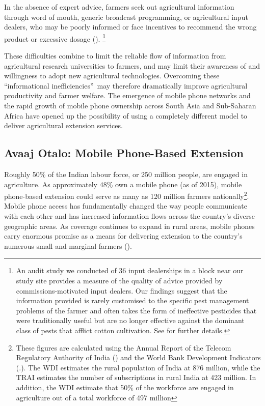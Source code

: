 \documentclass[12pt]{article}
\begin{document}
{\normalsize In the absence of expert advice, farmers seek out agricultural
information through word of mouth, generic broadcast programming, or
agricultural input dealers, who may be poorly informed or face incentives to
recommend the wrong product or excessive dosage (\citealp{Anderson_2007}).%
\footnote{%
An audit study we conducted of 36 input dealerships in a block near our
study site provides a measure of the quality of advice provided by
commissions-motivated input dealers. Our findings suggest that the
information provided is rarely customised to the specific pest management
problems of the farmer and often takes the form of ineffective pesticides
that were traditionally useful but are no longer effective against the
dominant class of pests that afflict cotton cultivation. See \citep{cole2017promise} for further details. }}

{\normalsize These difficulties combine to limit the reliable flow of
information from agricultural research universities to farmers, and may
limit their awareness of and willingness to adopt new agricultural
technologies. Overcoming these \textquotedblleft informational
inefficiencies\textquotedblright\ may therefore dramatically improve
agricultural productivity and farmer welfare. The emergence of mobile phone
networks and the rapid growth of mobile phone ownership across South Asia
and Sub-Saharan Africa have opened up the possibility of using a completely
different model to deliver agricultural extension services. }

\subsection{\protect\normalsize Avaaj Otalo: Mobile Phone-Based Extension}

{\normalsize Roughly 50\% of the Indian labour force, or 250 million people,
are engaged in agriculture. As approximately 48\% own a mobile phone (as of
2015), mobile phone-based extension could serve as many as 120 million
farmers nationally\footnote{%
These figures are calculated using the Annual Report of the Telecom
Regulatory Authority of India (\citealp{india2015annual}) and the World Bank
Development Indicators (\citealp{world2014world}.). The WDI estimates the
rural population of India at 876 million, while the TRAI estimates the
number of subscriptions in rural India at 423 million. In addition, the WDI
estimate that 50\% of the workforce are engaged in agriculture out of a
total workforce of 497 million}. Mobile phone access has fundamentally
changed the way people communicate with each other and has increased
information flows across the country's diverse geographic areas. As coverage
continues to expand in rural areas, mobile phones carry enormous promise as
a means for delivering extension to the country's numerous small and
marginal farmers (\citealp{Aker_2011}).}
\end{document}
